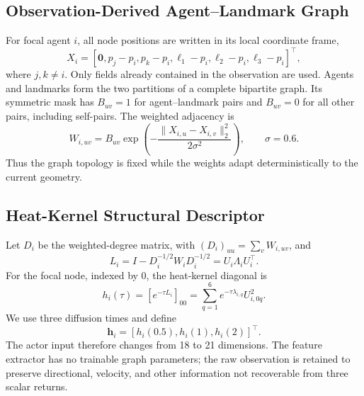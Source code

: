\documentclass{article}
\begin{document}
\subsection{Observation-Derived Agent--Landmark Graph}
For focal agent $i$, all node positions are written in its local coordinate frame,
\begin{equation}
 X_i=[\mathbf{0},p_j-p_i,p_k-p_i,\ell_1-p_i,\ell_2-p_i,\ell_3-p_i]^\top,
\end{equation}
where $j,k\neq i$. Only fields already contained in the observation are used. Agents and landmarks form the two partitions of a complete bipartite graph. Its symmetric mask has $B_{uv}=1$ for agent--landmark pairs and $B_{uv}=0$ for all other pairs, including self-pairs. The weighted adjacency is
\begin{equation}
 W_{i,uv}=B_{uv}\exp\left(-\frac{\|X_{i,u}-X_{i,v}\|_2^2}{2\sigma^2}\right),\qquad \sigma=0.6.
\end{equation}
Thus the graph topology is fixed while the weights adapt deterministically to the current geometry.

\subsection{Heat-Kernel Structural Descriptor}
Let $D_i$ be the weighted-degree matrix, with $(D_i)_{uu}=\sum_v W_{i,uv}$, and
\begin{equation}
 L_i=I-D_i^{-1/2}W_iD_i^{-1/2}=U_i\Lambda_iU_i^\top.
\end{equation}
For the focal node, indexed by 0, the heat-kernel diagonal is
\begin{equation}
 h_i(\tau)=[e^{-\tau L_i}]_{00}=\sum_{q=1}^{6}e^{-\tau\lambda_{i,q}}U_{i,0q}^{2}.
\end{equation}
We use three diffusion times and define
\begin{equation}
 \mathbf{h}_i=[h_i(0.5),h_i(1),h_i(2)]^\top.
\end{equation}
The actor input therefore changes from 18 to 21 dimensions. The feature extractor has no trainable graph parameters; the raw observation is retained to preserve directional, velocity, and other information not recoverable from three scalar returns.
\end{document}
